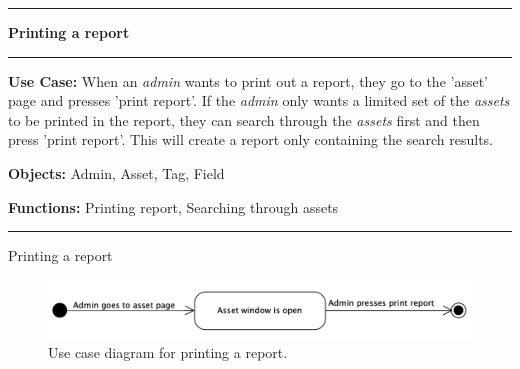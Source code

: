 \begin{use_case}[H]
    \hrule
    \vskip 0.3cm
    \Large
    \begin{center}
    
        \textbf{Printing a report}
        
    \end{center}
    \vskip 0.1cm
    \hrule
    \vskip 0.2cm
    \normalsize
    
    \textbf{Use Case:} When an \textit{admin} wants to print out a report, they go to the 'asset' page and presses 'print report'. If the \textit{admin} only wants a limited set of the \textit{assets} to be printed in the report, they can search through the \textit{assets} first and then press 'print report'. This will create a report only containing the search results.
    
    \vskip 0.2cm
    
    \textbf{Objects:} Admin, Asset, Tag, Field
    
    \vskip 0.2cm
    
    \textbf{Functions:} Printing report, Searching through assets
    
    \vskip 0.4cm
    \hrule
    \vskip 0.2cm
    \caption{Printing a report} \label{use_case:printing_a_report}
\end{use_case}

\begin{figure}[H]
    \centering
    \includegraphics[width=1.0\textwidth]{figures/PrintReport.png}
    \caption{Use case diagram for printing a report.}
    \label{fig:UseCasePrintReport}
\end{figure}


